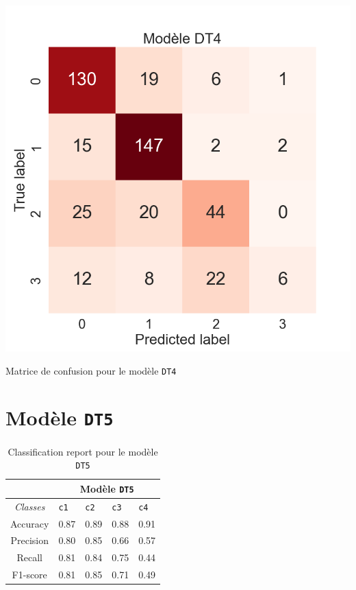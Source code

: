 \begin{table}[H]
    \includegraphics[scale=0.4]{images/y_pred_DT4.png}
    \caption{\label{HomePage} Matrice de confusion pour le modèle \texttt{DT4}}
\end{table}

\newpage

\section{Modèle \texttt{DT5}}

\begin{table}[ht]
  \begin{tabular}{ m{5em} | m{1cm}| m{1cm} | m{1cm}| m{1cm} | } 
  \cline{2-5}
             & \multicolumn{4}{|c|}{Modèle \texttt{DT5}}\\
 \hline
 \multicolumn{1}{|c|}{\textit{Classes}} & \hfil \texttt{c1} & \hfil \texttt{c2} & \hfil \texttt{c3} & \hfil \texttt{c4} \\ 
  \hline
  \multicolumn{1}{|c|}{Accuracy} & \hfil 0.87 & \hfil 0.89 & \hfil 0.88 & \hfil 0.91\\ 
  \hline
  \multicolumn{1}{|c|}{Precision} & \hfil 0.80 & \hfil 0.85 & \hfil 0.66 & \hfil 0.57 \\ 
  \hline
  \multicolumn{1}{|c|}{Recall} & \hfil 0.81 & \hfil 0.84 & \hfil 0.75 & \hfil 0.44 \\ 
  \hline
  \multicolumn{1}{|c|}{F1-score} & \hfil 0.81 & \hfil 0.85 & \hfil 0.71 & \hfil 0.49 \\ 
  \hline
\end{tabular}
\caption{Classification report pour le modèle \texttt{DT5}}
  \label{Tab:Tcr}
\end{table}

